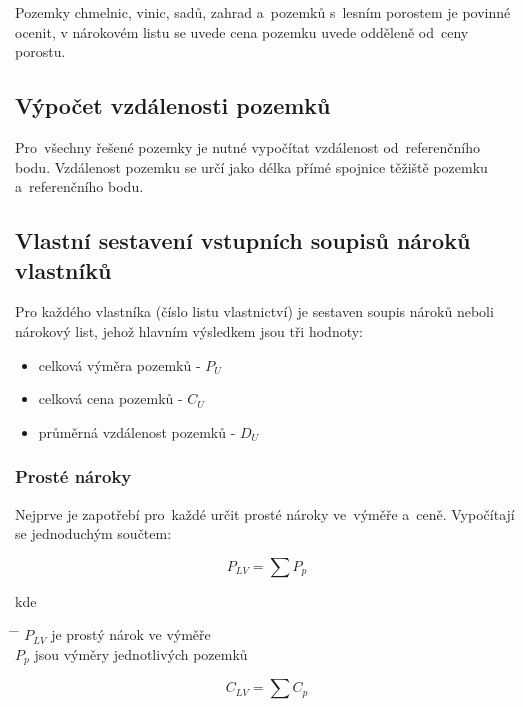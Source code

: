Pozemky chmelnic, vinic, sadů, zahrad a~pozemků s~lesním porostem je povinné ocenit, v nárokovém listu se uvede cena pozemku uvede odděleně od~ceny porostu.

\subsection{Výpočet vzdálenosti pozemků}
\label{vypocet_vzdalnosti_pozemku}

Pro~všechny řešené pozemky je nutné vypočítat vzdálenost od~referenčního bodu. Vzdálenost pozemku se určí jako délka přímé spojnice těžiště pozemku a~referenčního bodu.

\subsection{Vlastní sestavení vstupních soupisů nároků vlastníků}
\label{vlastni_naroky}

Pro každého vlastníka (číslo listu vlastnictví) je sestaven soupis nároků neboli nárokový list, jehož hlavním výsledkem jsou tři hodnoty:
	\begin{itemize}[leftmargin=1.5cm, noitemsep]
		\item celková výměra pozemků - $P_{U}$
		\item celková cena pozemků - $C_{U}$
		\item průměrná vzdálenost pozemků - $D_{U}$
	\end{itemize}

\subsubsection{Prosté nároky}
\label{proste_naroky}

Nejprve je zapotřebí pro~každé  určit prosté nároky ve~výměře a~ceně. Vypočítají se jednoduchým součtem:

\begin{equation}
	P_{LV} = \sum\nolimits P_{p}
\end{equation}

kde
\begin{tabbing}
\hspace{2em} \= \hspace{5em} \= \kill
	\> $P_{LV}$	\> je prostý nárok ve výměře \\
	\> $P_{p}$	\> jsou výměry jednotlivých pozemků
\end{tabbing}

\begin{equation}
	C_{LV} = \sum\nolimits C_{p}
\end{equation}

